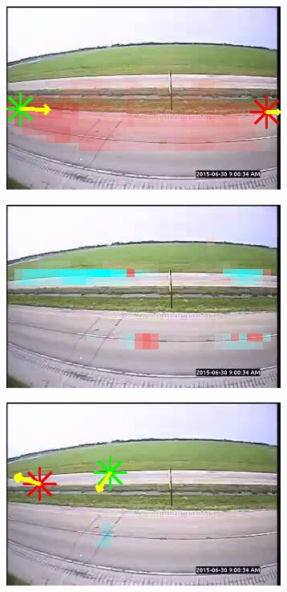 \begin{figure}
\begin{subfigure}{0.32\linewidth}
        \end{subfigure}
        \begin{subfigure}{0.32\linewidth}
            \includegraphics[width=\linewidth]{./img/scene_learning/res/245837/245837-3.jpg}
        \end{subfigure}
        \begin{subfigure}{0.32\linewidth}
            \includegraphics[width=\linewidth]{./img/scene_learning/res/245837/245837-4.jpg}
        \end{subfigure}
        \begin{subfigure}{0.32\linewidth}
            \includegraphics[width=\linewidth]{./img/scene_learning/res/245837/245837-5.jpg}

\end{subfigure}
\end{figure}

